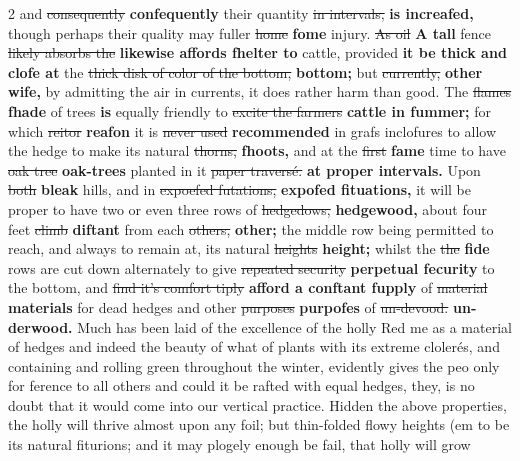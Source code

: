 \documentclass[10pt]{article}
\begin{document}
\begin{multicols}{2}
and \sout{consequently} \textbf{confequently} their quantity \sout{in intervals,} \textbf{is increafed,} though perhaps their quality may fuller \sout{home} \textbf{fome} injury. \sout{As oil} \textbf{A tall} fence \sout{likely absorbs the} \textbf{likewise affords fhelter to} cattle, provided \textbf{it be thick and clofe at} the \sout{thick disk of color of the bottom,} \textbf{bottom;} but \sout{currently,} \textbf{other wife,} by admitting the air in currents, it does rather harm than good. The \sout{flames} \textbf{fhade} of trees \textbf{is} equally friendly to \sout{excite the farmers} \textbf{cattle in fummer;} for which \sout{reitor} \textbf{reafon} it is \sout{never used} \textbf{recommended} in grafs inclofures to allow the hedge to make its natural \sout{thorns,} \textbf{fhoots,} and at the \sout{first} \textbf{fame} time to have \sout{oak tree} \textbf{oak-trees} planted in it \sout{paper traversé.} \textbf{at proper intervals.} Upon \sout{both} \textbf{bleak} hills, and in \sout{expoefed futations,} \textbf{ex­pofed fituations,} it will be proper to have two or even three rows of \sout{hedgedows,} \textbf{hedgewood,} about four feet \sout{climb} \textbf{diftant} from each \sout{others,} \textbf{other;} the middle row being permitted to reach, and always to remain at, its natural \sout{heights} \textbf{height;} whilst the \sout{the} \textbf{fide} rows are cut down alternately to give \sout{repeated security} \textbf{perpetual fecurity} to the bottom, and \sout{find it's comfort tiply} \textbf{afford a conftant fupply} of \sout{material} \textbf{materials} for dead hedges and other \sout{purposes} \textbf{purpofes} of \sout{un-devood.} \textbf{un­derwood.} Much has been laid of the excellence of the holly Red me as a material of hedges and indeed the beauty of what of plants with its extreme clolerés, and containing and rolling green throughout the winter, evidently gives the peo only for ference to all others and could it be rafted with equal hedges, they, is no doubt that it would come into our vertical practice. Hidden the above properties, the holly will thrive almost upon any foil; but thin-folded flowy heights (em to be its natural fiturions; and it may plogely enough be fail, that holly will grow
\end{multicols}
\end{document}
